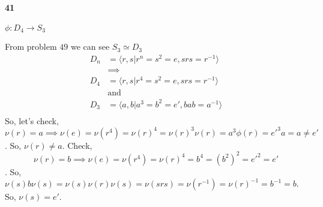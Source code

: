 \documentclass{article}
\begin{document}
\newpage
\paragraph{41} $\phi: D_4\rightarrow S_3$


From problem $49$ we can see $S_3\simeq D_3$
\begin{align*}
  D_n &= \langle r,s|r^n=s^2 = e, srs = r^{-1}\rangle\\
  &\implies\\
  D_4 &= \langle r,s|r^4=s^2 = e, srs = r^{-1}\rangle\\
  &\text{and}\\
  D_3 &= \langle a,b|a^3=b^2 = e', bab = a^{-1}\rangle\\
\end{align*}
So, let's check,
$$\nu(r)=a \implies \nu(e) = \nu(r^4) = \nu(r)^4 = \nu(r)^3\nu(r)
= a^3\phi(r) =e'^3a = a \neq e'$$.
So, $\nu(r)\neq a$. Check,
$$\nu(r)=b \implies \nu(e) = \nu(r^4) = \nu(r)^4 = b^4
= (b^2)^2 =e'^2 = e'$$.
So, $ \nu(s) b \nu(s) = \nu(s)\nu(r)\nu(s)=\nu(srs)=\nu(r^{-1}) =\nu(r)^{-1} =
b^{-1} = b$. So, $\nu(s) = e'$.
\end{document}
